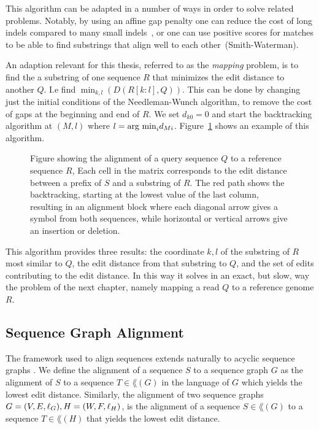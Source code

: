 This algorithm can be adapted in a number of ways in order to solve related problems.
Notably, by using an affine gap penalty one can reduce the cost of long indels compared to many small indels~\cite{affine}, or one can use positive scores for matches to be able to find substrings that align well to each other~\cite{smithwaterman}(Smith-Waterman).

An adaption relevant for this thesis, referred to as the \emph{mapping} problem, is to find the a substring of one sequence $R$ that minimizes the edit distance to another $Q$.
I.e find $\min_{k, l}(D(R[k:l], Q))$.
This can be done by changing just the initial conditions of the Needleman-Wunch algorithm, to remove the cost of gaps at the beginning and end of $R$.
We set $d_{k0} = 0$ and start the backtracking algorithm at $(M, l)$ where $l=\argmin_i d_{Mi}$.
Figure~\ref{fig:needlemanmap} shows an example of this algorithm.
\begin{figure}
  \begin{tikzpicture}
    
  \end{tikzpicture}
  \caption{
    Figure showing the alignment of a query sequence $Q$ to a reference sequence $R$, 
    Each cell in the matrix corresponds to the edit distance between a prefix of $S$ and a substring of $R$. The red path shows the backtracking, starting at the lowest value of the last column, resulting in an alignment block where each diagonal arrow gives a symbol from both sequences, while horizontal or vertical arrows give an insertion or deletion.}
  \label{fig:needlemanmap}
\end{figure}
This algorithm provides three results: the coordinate $k, l$ of the substring of $R$ most similar to $Q$, the edit distance from that substring to $Q$, and the set of edits contributing to the edit distance.
In this way it solves in an exact, but slow, way the problem of the next chapter, namely mapping a read $Q$ to a reference genome $R$.

\subsection{Sequence Graph Alignment}
The framework used to align sequences extends naturally to acyclic sequence graphs \cite{hein, poa}.
We define the alignment of a sequence $S$ to a sequence graph $G$ as the alignment of $S$ to a sequence $T \in \lang(G)$ in the language of $G$ which yields the lowest edit distance.
Similarly, the alignment of two sequence graphs $G=(V, E, \slabel_G), H=(W, F, \slabel_H)$, is the alignment of a sequence $S \in \lang(G)$ to a sequence $T \in \lang(H)$ that yields the lowest edit distance.

